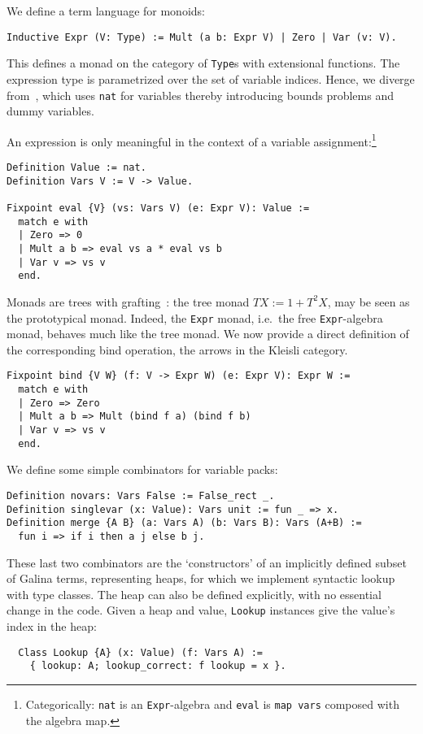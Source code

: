 \documentclass[a4paper,10pt,runningheads]{llncs}
\begin{document}
We define a term language for monoids:
\begin{lstlisting}
Inductive Expr (V: Type) := Mult (a b: Expr V) | Zero | Var (v: V).
\end{lstlisting}

This defines a monad on the category of \lstinline|Type|s with extensional functions.
The expression type is parametrized over the set of variable indices. Hence, we diverge from~\cite{Hints}, 
which uses \lstinline|nat| for variables thereby introducing bounds problems and dummy variables.

\noindent An expression is only meaningful in the context of a variable
assignment:\footnote{Categorically: \lstinline|nat| is
an \lstinline|Expr|-algebra and \lstinline|eval| is \lstinline|map vars| composed with the algebra map.}
\begin{lstlisting}
Definition Value := nat.
Definition Vars V := V -> Value.

Fixpoint eval {V} (vs: Vars V) (e: Expr V): Value :=
  match e with
  | Zero => 0
  | Mult a b => eval vs a * eval vs b
  | Var v => vs v
  end.
\end{lstlisting}

%
Monads are trees with grafting~\cite{MonadsGrafting}: the tree monad
$TX:=1+T^2X$, may be seen as the prototypical monad. Indeed, the \lstinline|Expr| monad, i.e.\ the free
\lstinline|Expr|-algebra monad, behaves much like the tree monad. We now provide a direct definition of the
corresponding bind operation, the arrows in the Kleisli category.

\begin{lstlisting}
Fixpoint bind {V W} (f: V -> Expr W) (e: Expr V): Expr W :=
  match e with
  | Zero => Zero
  | Mult a b => Mult (bind f a) (bind f b)
  | Var v => vs v
  end.
\end{lstlisting}



\noindent We define some simple combinators for variable packs:
%
\begin{lstlisting}
Definition novars: Vars False := False_rect _.
Definition singlevar (x: Value): Vars unit := fun _ => x.
Definition merge {A B} (a: Vars A) (b: Vars B): Vars (A+B) :=
  fun i => if i then a j else b j.
\end{lstlisting}


\noindent These last two combinators are the `constructors' of an implicitly defined subset of
 Galina terms, representing heaps, for which we implement syntactic lookup with type classes.
The heap can also be defined explicitly, with no essential change in the code.
Given a heap and value, \lstinline|Lookup| instances give the value's index in the heap:
\begin{lstlisting}
  Class Lookup {A} (x: Value) (f: Vars A) :=
    { lookup: A; lookup_correct: f lookup = x }.
\end{lstlisting}
\end{document}
